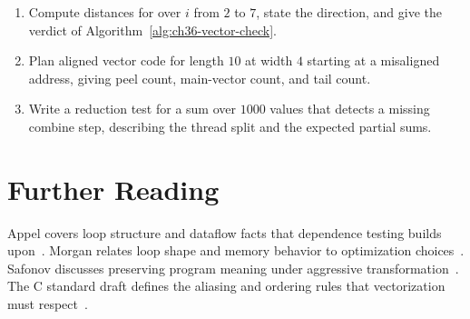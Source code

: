 \begin{enumerate}
\item Compute distances for  over $i$ from $2$ to $7$, state the direction, and give the verdict of Algorithm~\ref{alg:ch36-vector-check}.\label{ex:ch36-distance-math}
\item Plan aligned vector code for length $10$ at width $4$ starting at a misaligned address, giving peel count, main-vector count, and tail count.\label{ex:ch36-tail-plan}
\item Write a reduction test for a sum over $1000$ values that detects a missing combine step, describing the thread split and the expected partial sums.\label{ex:ch36-reduction-test}
\end{enumerate}

\section{Further Reading}\label{sec:ch36-reading}

Appel covers loop structure and dataflow facts that dependence testing builds upon~\cite{appel-1998-modern}.
Morgan relates loop shape and memory behavior to optimization choices~\cite{morgan-1998-optimizing}.
Safonov discusses preserving program meaning under aggressive transformation~\cite{safonov-2010-trustworthy}.
The C standard draft defines the aliasing and ordering rules that vectorization must respect~\cite{wg14-2011-c11}.
